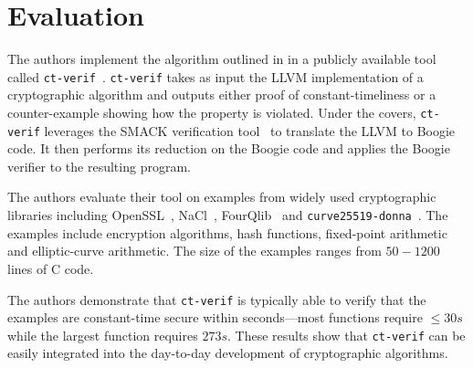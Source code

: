\section{Evaluation}
\label{sec:eval}

The authors implement the algorithm outlined in  in a publicly available tool called \texttt{ct-verif}~\cite{ct-verif-github}. 
\texttt{ct-verif} takes as input the LLVM implementation of a cryptographic algorithm and outputs either proof of constant-timeliness or a counter-example showing how the property is violated. 
Under the covers, \texttt{ct-verif} leverages the SMACK verification tool~\cite{smack} to translate the LLVM to Boogie~\cite{boogie} code. 
It then performs its reduction on the Boogie code and applies the Boogie verifier to the resulting program. 

The authors evaluate their tool on examples from widely used cryptographic libraries including OpenSSL~\cite{openssl}, NaCl~\cite{nacl}, FourQlib~\cite{fourqlib} and \texttt{curve25519-donna}~\cite{donna}. The examples include encryption algorithms, hash functions, fixed-point arithmetic and elliptic-curve arithmetic. 
The size of the examples ranges from $50-1200$ lines of C code.

The authors demonstrate that \texttt{ct-verif} is typically able to verify that the examples are constant-time secure within seconds---most functions require $\leq 30s$ while the largest function requires $273s$. 
These results show that \texttt{ct-verif} can be easily integrated into the day-to-day development of cryptographic algorithms. 